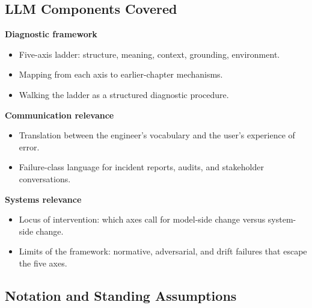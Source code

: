 \subsection{LLM Components Covered}

\textbf{Diagnostic framework}
\begin{itemize}
  \item Five-axis ladder: structure, meaning, context, grounding,
        environment.
  \item Mapping from each axis to earlier-chapter mechanisms.
  \item Walking the ladder as a structured diagnostic procedure.
\end{itemize}

\textbf{Communication relevance}
\begin{itemize}
  \item Translation between the engineer's vocabulary and the
        user's experience of error.
  \item Failure-class language for incident reports, audits, and
        stakeholder conversations.
\end{itemize}

\textbf{Systems relevance}
\begin{itemize}
  \item Locus of intervention: which axes call for model-side
        change versus system-side change.
  \item Limits of the framework: normative, adversarial, and
        drift failures that escape the five axes.
\end{itemize}

\subsection{Notation and Standing Assumptions}
\label{sec:week12-notation}

